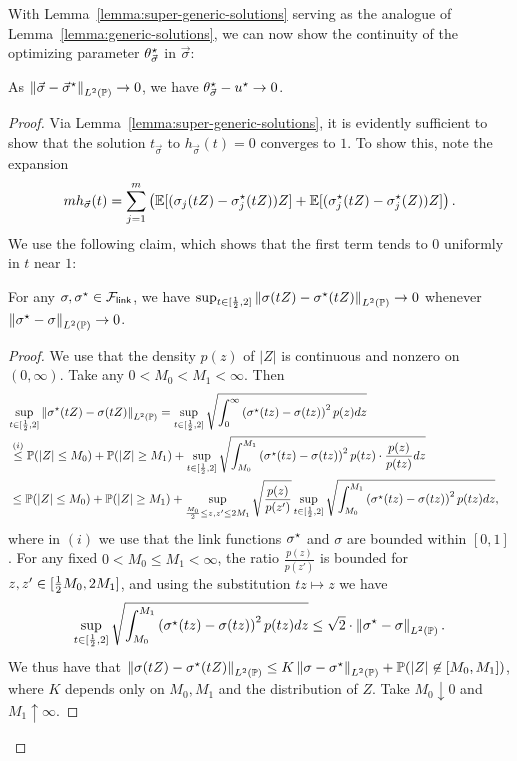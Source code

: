 With Lemma~\ref{lemma:super-generic-solutions} serving as the analogue
of Lemma~\ref{lemma:generic-solutions}, we can now show
the continuity of the optimizing parameter $\theta^\star_{\vec{\sigma}}$
in $\vec{\sigma}$:
\begin{lemma}
	\label{lemma:vec-sigma-theta-continuity}
	As $\left\|{\vec{\sigma} - \vec{\sigma}^\star}\right\|_{L^2(\mathbb{P})} \to 0$,
	we have $\theta^\star_{\vec{\sigma}} - u^\star \to 0$.
\end{lemma}
\begin{proof}
	Via Lemma~\ref{lemma:super-generic-solutions}, it is evidently
	sufficient to show that the solution $t_{\vec{\sigma}}$ to
	$h_{\vec{\sigma}}(t) = 0$ converges to $1$.
	To show this,
	note the expansion
	\begin{equation}
		\label{eqn:expand-h-m}
		m h_{\vec{\sigma}}(t) =
		\sum_{j = 1}^m \left(\mathbb{E}[(\sigma_j(tZ) - \sigma_j^\star(tZ)) Z]
		+ \mathbb{E}[(\sigma_j^\star(tZ) - \sigma_j^\star(Z))Z]
		\right).
	\end{equation}
	We use the following claim, which shows that
	the first term tends to 0 uniformly in $t$ near $1$:
	\begin{claim}
		\label{claim:taco}
		For any $\sigma, \sigma^\star \in \mathcal{F}_{\mathsf{link}}$, we have
		$\sup_{t \in [\frac{1}{2},2]} \left\|{\sigma(tZ) - \sigma^\star(tZ)}\right\|_{L^2(\mathbb{P})}
		\to 0$ whenever $\left\|{\sigma^\star - \sigma}\right\|_{L^2(\mathbb{P})} \to 0$.
	\end{claim}
	\begin{proof}
		We use that the density $p(z)$ of $|Z|$ is continuous
		and nonzero on $(0, \infty)$. Take any $0 < M_0 < M_1 < \infty$.
		Then
		\begin{align*}
			\lefteqn{\sup_{t \in [\half, 2]}
				\LtwoP{\sigma\opt(tZ) - \sigma(tZ)}
				=  \sup_{t \in [\half, 2]} \sqrt{\int_0^\infty \prn{\sigma\opt(tz) - \sigma(tz)}^2 p(z) dz}} \\
			& \stackrel{(i)}{\leq}
			\Prb(|Z| \leq M_0) + \Prb(|Z| \geq M_1) +
			\sup_{t \in [\half, 2]} \sqrt{\int_{M_0}^{M_1}
				\prn{\sigma\opt(tz) - \sigma(tz)}^2 p(tz) \cdot
				\frac{p(z)}{p(tz)} dz} \nonumber \\
			& \leq \Prb(|Z| \leq M_0) + \Prb(|Z| \geq M_1) + \sup_{
				\frac{M_0}{2} \le z, z'
				\le 2 M_1}
			\sqrt{\frac{p(z)}{p(z')}}
			\sup_{t \in [\half, 2]} \sqrt{\int_{M_0}^{M_1}
				\prn{\sigma\opt(tz) - \sigma(tz)}^2 p(tz) dz}  ,
		\end{align*}
		where in $(i)$ we use that the link functions $\sigma^\star$ and $\sigma$
		are bounded within $[0,1]$. For any fixed $0 < M_0 \le M_1 < \infty$,
		the ratio $\frac{p(z)}{p(z')}$ is bounded
		for $z, z' \in [\frac{1}{2} M_0, 2 M_1]$, and using
		the substitution $tz \mapsto z$ we have
		\begin{align*}
			\sup_{t \in [\frac{1}{2}, 2]} \sqrt{
				\int_{M_0}^{M_1}
				\left({\sigma^\star(tz) - \sigma(tz)}\right)^2 p(tz) dz}
			\leq \sqrt{2} \cdot \left\|{\sigma^\star - \sigma}\right\|_{L^2(\mathbb{P})}.
		\end{align*}
		We thus have that
		$\left\|{\sigma(tZ) - \sigma^\star(tZ)}\right\|_{L^2(\mathbb{P})}
		\le K \left\|{\sigma - \sigma^\star}\right\|_{L^2(\mathbb{P})}
		+ \mathbb{P}(|Z| \not \in [M_0, M_1])$,
		where $K$ depends only on $M_0, M_1$ and the
		distribution of $Z$.
		Take $M_0 \downarrow 0$ and $M_1 \uparrow \infty$.
	\end{proof}
	

\end{proof}
